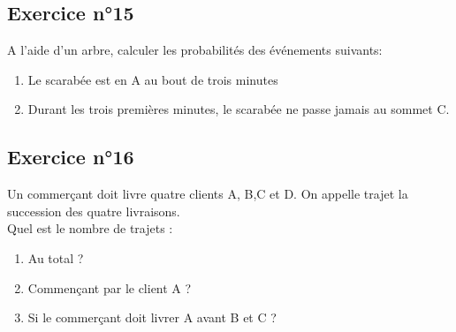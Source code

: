 \documentclass[12pt,a4paper]{article}
\begin{document}
\subsection*{Exercice n°15}


A l'aide d'un arbre, calculer les probabilités des événements suivants:

\begin{enumerate}
    \item Le scarabée est en A au bout de trois minutes
    \item Durant les trois premières minutes, le scarabée ne passe jamais au sommet C.
\end{enumerate}

\subsection*{Exercice n°16}

Un commerçant doit livre quatre clients A, B,C et D. On appelle trajet la succession des quatre livraisons.\\
Quel est le nombre de trajets :

\begin{enumerate}
    \item Au total ?
    \item Commençant par le client A ?
    \item Si le commerçant doit livrer A avant B et C ?
\end{enumerate}
\end{document}
